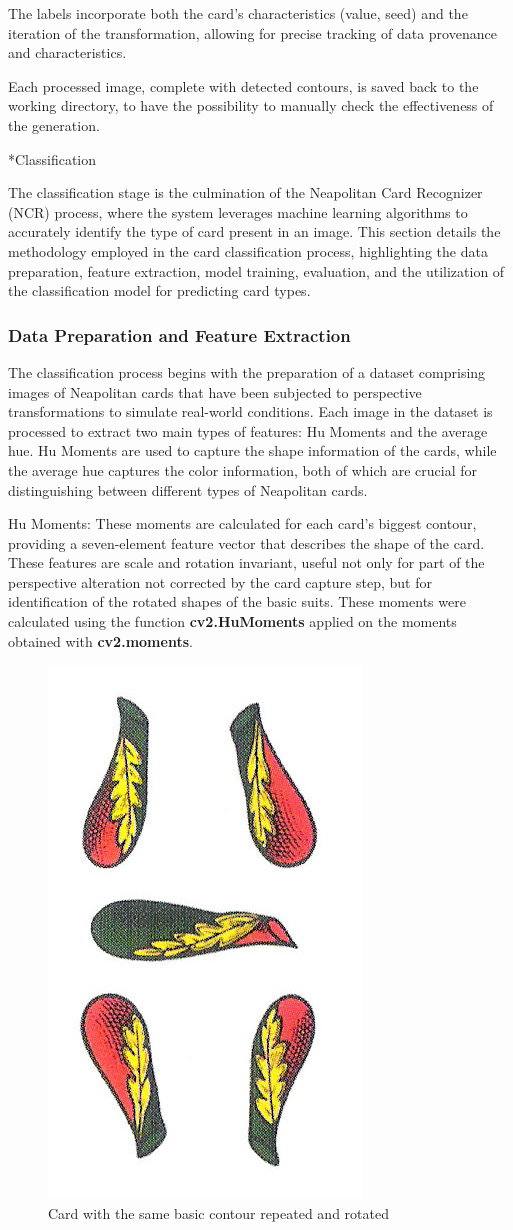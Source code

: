 \documentclass[twocolumn, a4paper,10pt]{article}
\makeatletter
\renewcommand\subsection{\@startsection{subsection}{1}{\z@}{\z@}{\z@}{\normalfont\normalsize\bfseries}}
\renewcommand\subsection{\@startsection{subsection}{1}{\z@}{\z@}{0.1pt}{\normalfont\normalsize\bfseries}}
\makeatother
\begin{document}
The labels incorporate both the card's characteristics (value, seed) and the iteration of the transformation, allowing for precise tracking of data provenance and characteristics.

Each processed image, complete with detected contours, is saved back to the working directory, to have the possibility to manually check the effectiveness of the generation.

\subsection*{Classification}

The classification stage is the culmination of the Neapolitan Card Recognizer (NCR) process, where the system leverages machine learning algorithms to accurately identify the type of card present in an image. This section details the methodology employed in the card classification process, highlighting the data preparation, feature extraction, model training, evaluation, and the utilization of the classification model for predicting card types.

\subsubsection*{Data Preparation and Feature Extraction}
The classification process begins with the preparation of a dataset comprising images of Neapolitan cards that have been subjected to perspective transformations to simulate real-world conditions. Each image in the dataset is processed to extract two main types of features: Hu Moments and the average hue. Hu Moments are used to capture the shape information of the cards, while the average hue captures the color information, both of which are crucial for distinguishing between different types of Neapolitan cards.

Hu Moments: These moments are calculated for each card's biggest contour, providing a seven-element feature vector that describes the shape of the card. These features are scale and rotation invariant, useful not only for part of the perspective alteration not corrected by the card capture step, but for identification of the rotated shapes of the basic suits.  These moments were calculated using the function \textbf{cv2.HuMoments} applied on the moments obtained with \textbf{cv2.moments}.

\begin{figure}[H]
  \centering
  \includegraphics[width=.23\textwidth]{img/5B.jpg}

  \caption*{Card with the same basic contour repeated and rotated}
\end{figure}
\end{document}
